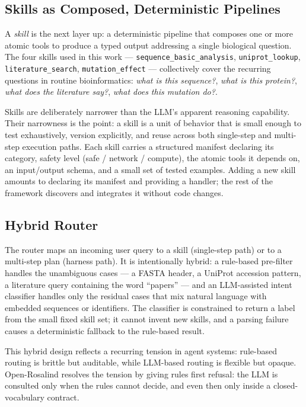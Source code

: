 \documentclass[11pt,letterpaper]{article}
\begin{document}
\subsection{Skills as Composed, Deterministic Pipelines}
\label{sec:skills}
A \emph{skill} is the next layer up: a deterministic pipeline that composes one or more atomic tools to produce a typed output addressing a single biological question. The four skills used in this work --- \texttt{sequence\_basic\_analysis}, \texttt{uniprot\_lookup}, \texttt{literature\_search}, \texttt{mutation\_effect} --- collectively cover the recurring questions in routine bioinformatics: \emph{what is this sequence?}, \emph{what is this protein?}, \emph{what does the literature say?}, \emph{what does this mutation do?}.

Skills are deliberately narrower than the LLM's apparent reasoning capability. Their narrowness is the point: a skill is a unit of behavior that is small enough to test exhaustively, version explicitly, and reuse across both single-step and multi-step execution paths. Each skill carries a structured manifest declaring its category, safety level (safe / network / compute), the atomic tools it depends on, an input/output schema, and a small set of tested examples. Adding a new skill amounts to declaring its manifest and providing a handler; the rest of the framework discovers and integrates it without code changes.

\subsection{Hybrid Router}
\label{sec:router}
The router maps an incoming user query to a skill (single-step path) or to a multi-step plan (harness path). It is intentionally hybrid: a rule-based pre-filter handles the unambiguous cases --- a FASTA header, a UniProt accession pattern, a literature query containing the word ``papers'' --- and an LLM-assisted intent classifier handles only the residual cases that mix natural language with embedded sequences or identifiers. The classifier is constrained to return a label from the small fixed skill set; it cannot invent new skills, and a parsing failure causes a deterministic fallback to the rule-based result.

This hybrid design reflects a recurring tension in agent systems: rule-based routing is brittle but auditable, while LLM-based routing is flexible but opaque. Open-Rosalind resolves the tension by giving rules first refusal: the LLM is consulted only when the rules cannot decide, and even then only inside a closed-vocabulary contract.
\end{document}
